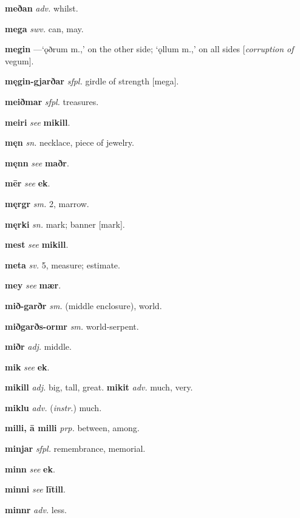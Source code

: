 \documentclass[12pt,letterpaper]{book}
\begin{document}
\noindent
\textbf{meðan} \textit{adv.} whilst.

\noindent
\textbf{mega} \textit{swv.} can, may.

\noindent
\textbf{megin} \textit{} ---`ǫðrum m.,' on the other side; `ǫllum m.,' on all
	sides [\textit{corruption of} vegum].

\noindent
\textbf{męgin-gjarðar} \textit{sfpl.} girdle of strength [mega].

\noindent
\textbf{meiðmar} \textit{sfpl.} treasures.

\noindent
\textbf{meiri} \textit{} \textit{see} \textbf{mikill}.

\noindent
\textbf{męn} \textit{sn.} necklace, piece of jewelry.

\noindent
\textbf{męnn} \textit{} \textit{see} \textbf{maðr}.

\noindent
\textbf{mēr} \textit{} \textit{see} \textbf{ek}.

\noindent
\textbf{męrgr} \textit{sm.} 2, marrow.

\noindent
\textbf{męrki} \textit{sn.} mark; banner [mark].

\noindent
\textbf{mest} \textit{} \textit{see} \textbf{mikill}.

\noindent
\textbf{meta} \textit{sv.} 5, measure; estimate.

\noindent
\textbf{mey} \textit{} \textit{see} \textbf{mær}.

\noindent
\textbf{mið-garðr} \textit{sm.} (middle enclosure), world.

\noindent
\textbf{miðgarðs-ormr} \textit{sm.} world-serpent.

\noindent
\textbf{miðr} \textit{adj.} middle.

\noindent
\textbf{mik} \textit{} \textit{see} \textbf{ek}.

\noindent
\textbf{mikill} \textit{adj.} big, tall, great.  \textbf{mikit} \textit{adv.}
	much, very.

\noindent
\textbf{miklu} \textit{adv.} (\textit{instr.}) much.

\noindent
\textbf{milli, ā milli} \textit{prp.} between, among.

\noindent
\textbf{minjar} \textit{sfpl.} remembrance, memorial.

\noindent
\textbf{minn} \textit{} \textit{see} \textbf{ek}.

\noindent
\textbf{minni} \textit{} \textit{see} \textbf{lītill}.

\noindent
\textbf{minnr} \textit{adv.} less.
\end{document}
